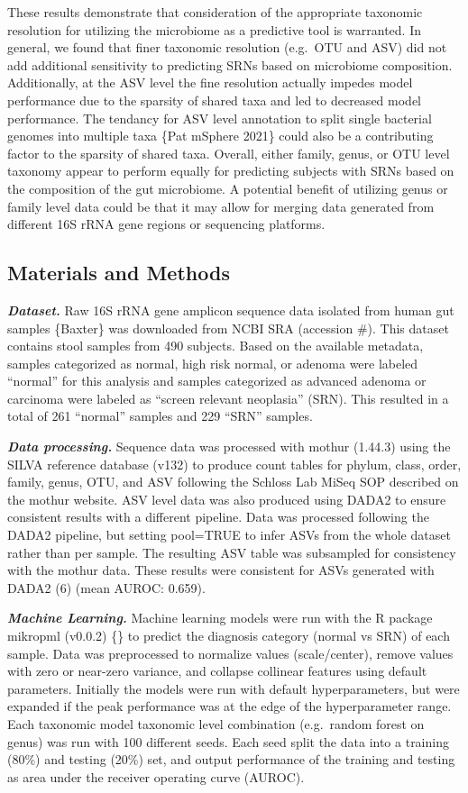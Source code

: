 \documentclass[]{article}
\begin{document}
These results demonstrate that consideration of the appropriate
taxonomic resolution for utilizing the microbiome as a predictive tool
is warranted. In general, we found that finer taxonomic resolution
(e.g.~OTU and ASV) did not add additional sensitivity to predicting SRNs
based on microbiome composition. Additionally, at the ASV level the fine
resolution actually impedes model performance due to the sparsity of
shared taxa and led to decreased model performance. The tendancy for ASV
level annotation to split single bacterial genomes into multiple taxa
\{Pat mSphere 2021\} could also be a contributing factor to the sparsity
of shared taxa. Overall, either family, genus, or OTU level taxonomy
appear to perform equally for predicting subjects with SRNs based on the
composition of the gut microbiome. A potential benefit of utilizing
genus or family level data could be that it may allow for merging data
generated from different 16S rRNA gene regions or sequencing platforms.

\subsection{Materials and Methods}\label{materials-and-methods}

\textbf{\emph{Dataset.}} Raw 16S rRNA gene amplicon sequence data
isolated from human gut samples \{Baxter\} was downloaded from NCBI SRA
(accession \#). This dataset contains stool samples from 490 subjects.
Based on the available metadata, samples categorized as normal, high
risk normal, or adenoma were labeled ``normal'' for this analysis and
samples categorized as advanced adenoma or carcinoma were labeled as
``screen relevant neoplasia'' (SRN). This resulted in a total of 261
``normal'' samples and 229 ``SRN'' samples.

\textbf{\emph{Data processing.}} Sequence data was processed with mothur
(1.44.3) using the SILVA reference database (v132) to produce count
tables for phylum, class, order, family, genus, OTU, and ASV following
the Schloss Lab MiSeq SOP described on the mothur website. ASV level
data was also produced using DADA2 to ensure consistent results with a
different pipeline. Data was processed following the DADA2 pipeline, but
setting pool=TRUE to infer ASVs from the whole dataset rather than per
sample. The resulting ASV table was subsampled for consistency with the
mothur data. These results were consistent for ASVs generated with DADA2
(6) (mean AUROC: 0.659).

\textbf{\emph{Machine Learning.}} Machine learning models were run with
the R package mikropml (v0.0.2) \{\} to predict the diagnosis category
(normal vs SRN) of each sample. Data was preprocessed to normalize
values (scale/center), remove values with zero or near-zero variance,
and collapse collinear features using default parameters. Initially the
models were run with default hyperparameters, but were expanded if the
peak performance was at the edge of the hyperparameter range. Each
taxonomic model taxonomic level combination (e.g.~random forest on
genus) was run with 100 different seeds. Each seed split the data into a
training (80\%) and testing (20\%) set, and output performance of the
training and testing as area under the receiver operating curve (AUROC).
\end{document}
